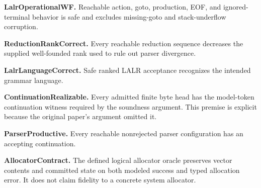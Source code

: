 \begin{assumption}
  \label{asm:lalr-operational-wf}
  \notready
  \textbf{LalrOperationalWF.}
  Reachable action, goto, production, EOF, and ignored-terminal behavior is
  safe and excludes missing-goto and stack-underflow corruption.
\end{assumption}

\begin{assumption}
  \label{asm:reduction-rank-correct}
  \notready
  \textbf{ReductionRankCorrect.}
  Every reachable reduction sequence decreases the supplied well-founded rank
  used to rule out parser divergence.
\end{assumption}

\begin{assumption}
  \label{asm:lalr-language-correct}
  \notready
  \textbf{LalrLanguageCorrect.}
  Safe ranked LALR acceptance recognizes the intended grammar language.
\end{assumption}

\begin{assumption}
  \label{asm:continuation-realizable}
  \notready
  \textbf{ContinuationRealizable.}
  Every admitted finite byte head has the model-token continuation witness
  required by the soundness argument.  This premise is explicit because the
  original paper's argument omitted it.
\end{assumption}

\begin{assumption}
  \label{asm:parser-productive}
  \notready
  \textbf{ParserProductive.}
  Every reachable nonrejected parser configuration has an accepting
  continuation.
\end{assumption}

\begin{assumption}
  \label{asm:allocator-contract}
  \notready
  \textbf{AllocatorContract.}
  The defined logical allocator oracle preserves vector contents and committed
  state on both modeled success and typed allocation error.  It does not claim
  fidelity to a concrete system allocator.
\end{assumption}

